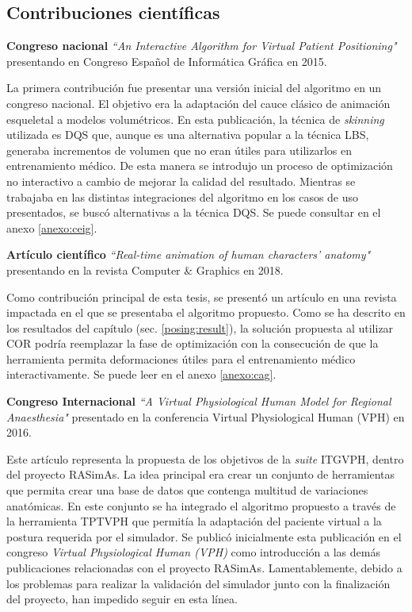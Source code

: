 \subsection{Contribuciones científicas}
\label{conclu:cientifica}

\textbf{Congreso nacional } \emph{``An Interactive Algorithm for Virtual Patient Positioning"} \cite{ceig.20151197} presentando en Congreso Español de Informática Gráfica en 2015. 

La primera contribución fue presentar una versión inicial del algoritmo en un congreso nacional. El objetivo era la adaptación del cauce clásico de animación esqueletal a modelos volumétricos. En esta publicación, la técnica de \emph{skinning} utilizada es \ac{DQS} que, aunque es una alternativa popular a la técnica \ac{LBS}, generaba incrementos de volumen que no eran útiles para utilizarlos en entrenamiento médico. De esta manera se introdujo un proceso de optimización no interactivo a cambio de mejorar la calidad del resultado. Mientras se trabajaba en las distintas integraciones del algoritmo en los casos de uso presentados, se buscó alternativas a la técnica \ac{DQS}. Se puede consultar en el anexo \ref{anexo:ceig}.

\textbf{Artículo científico }\emph{``Real-time animation of human characters' anatomy"} \cite{SUJAR2018268} presentando en la revista Computer \& Graphics en 2018. 


Como contribución principal de esta tesis, se presentó un artículo en una revista impactada en el que se presentaba el algoritmo propuesto. Como se ha descrito en los resultados del capítulo (sec. \ref{posing:result}), la solución propuesta al utilizar \ac{COR} podría reemplazar la fase de optimización con la consecución de que la herramienta permita deformaciones útiles para el entrenamiento médico interactivamente. Se puede leer en el anexo \ref{anexo:cag}.

\textbf{ Congreso Internacional }\emph{``A Virtual Physiological Human Model for Regional Anaesthesia"} \cite{VHZKLBSGSD16} presentado en la conferencia Virtual Physiological Human (VPH) en 2016.

Este artículo representa la propuesta de los objetivos de la \emph{suite} \ac{ITGVPH}, dentro del proyecto \ac{RASimAs}. La idea principal era crear un conjunto de herramientas que permita crear una base de datos que contenga multitud de variaciones anatómicas. En este conjunto se ha integrado el algoritmo propuesto a través de la herramienta \ac{TPTVPH} que permitía la adaptación del paciente virtual a la postura requerida por el simulador. Se publicó inicialmente esta publicación en el congreso \emph{ Virtual Physiological Human (VPH)} como introducción a las demás publicaciones relacionadas con el proyecto \ac{RASimAs}. Lamentablemente, debido a los problemas para realizar la validación del simulador junto con la finalización del proyecto, han  impedido seguir en esta línea. %

